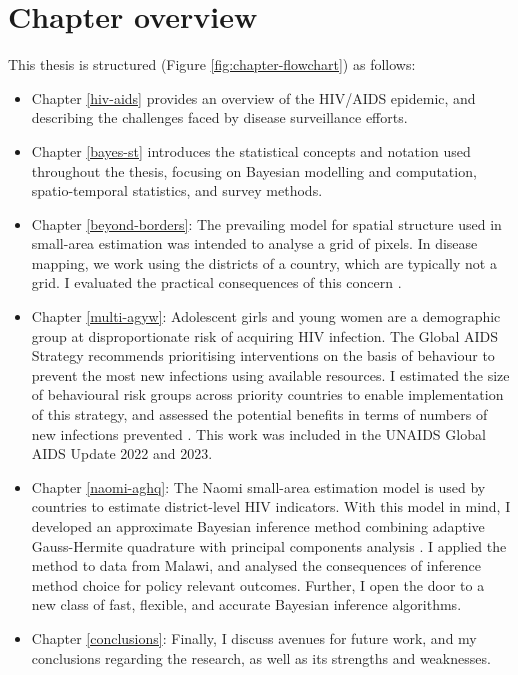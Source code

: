 \documentclass[a4paper, nobind]{templates/ociamthesis}
\providecommand{\tightlist}{%
  \setlength{\itemsep}{0pt}\setlength{\parskip}{0pt}}
\begin{document}
\hypertarget{chapter-overview}{%
\section{Chapter overview}\label{chapter-overview}}

This thesis is structured (Figure \ref{fig:chapter-flowchart}) as follows:

\begin{itemize}
\tightlist
\item
  Chapter \ref{hiv-aids} provides an overview of the HIV/AIDS epidemic, and describing the challenges faced by disease surveillance efforts.
\item
  Chapter \ref{bayes-st} introduces the statistical concepts and notation used throughout the thesis, focusing on Bayesian modelling and computation, spatio-temporal statistics, and survey methods.
\item
  Chapter \ref{beyond-borders}: The prevailing model for spatial structure used in small-area estimation \autocite{besag1991bayesian} was intended to analyse a grid of pixels.
  In disease mapping, we work using the districts of a country, which are typically not a grid.
  I evaluated the practical consequences of this concern \autocite{howes2023beyond}.
\item
  Chapter \ref{multi-agyw}: Adolescent girls and young women are a demographic group at disproportionate risk of acquiring HIV infection.
  The Global AIDS Strategy recommends prioritising interventions on the basis of behaviour to prevent the most new infections using available resources.
  I estimated the size of behavioural risk groups across priority countries to enable implementation of this strategy, and assessed the potential benefits in terms of numbers of new infections prevented \autocite{howes2023spatio}.
  This work was included in the UNAIDS Global AIDS Update 2022 and 2023.
\item
  Chapter \ref{naomi-aghq}: The Naomi small-area estimation model \autocite{eaton2021naomi} is used by countries to estimate district-level HIV indicators.
  With this model in mind, I developed an approximate Bayesian inference method combining adaptive Gauss-Hermite quadrature with principal components analysis \autocite{howes2023fast}.
  I applied the method to data from Malawi, and analysed the consequences of inference method choice for policy relevant outcomes.
  Further, I open the door to a new class of fast, flexible, and accurate Bayesian inference algorithms.
\item
  Chapter \ref{conclusions}: Finally, I discuss avenues for future work, and my conclusions regarding the research, as well as its strengths and weaknesses.
\end{itemize}
\end{document}

